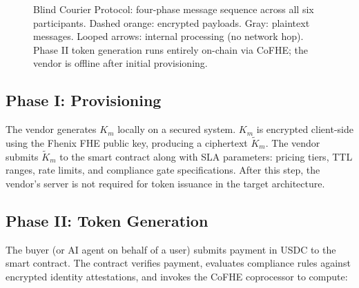 \documentclass[conference]{IEEEtran}
\begin{document}
\begin{figure}[!t]
\caption{Blind Courier Protocol: four-phase message sequence across all six participants.
Dashed orange: encrypted payloads. Gray: plaintext messages. Looped arrows: internal
processing (no network hop). Phase II token generation runs entirely on-chain via
CoFHE; the vendor is offline after initial provisioning.}
\label{fig:protocol}
\end{figure}

\subsection{Phase I: Provisioning}
The vendor generates $K_m$ locally on a secured system. $K_m$ is encrypted client-side
using the Fhenix FHE public key, producing a ciphertext $\tilde{K}_m$. The vendor
submits $\tilde{K}_m$ to the smart contract along with SLA parameters: pricing tiers,
TTL ranges, rate limits, and compliance gate specifications. After this step, the vendor's
server is not required for token issuance in the target architecture.

\subsection{Phase II: Token Generation}
The buyer (or AI agent on behalf of a user) submits payment in USDC to the smart contract.
The contract verifies payment, evaluates compliance rules against encrypted identity
attestations, and invokes the CoFHE coprocessor to compute:
\end{document}
